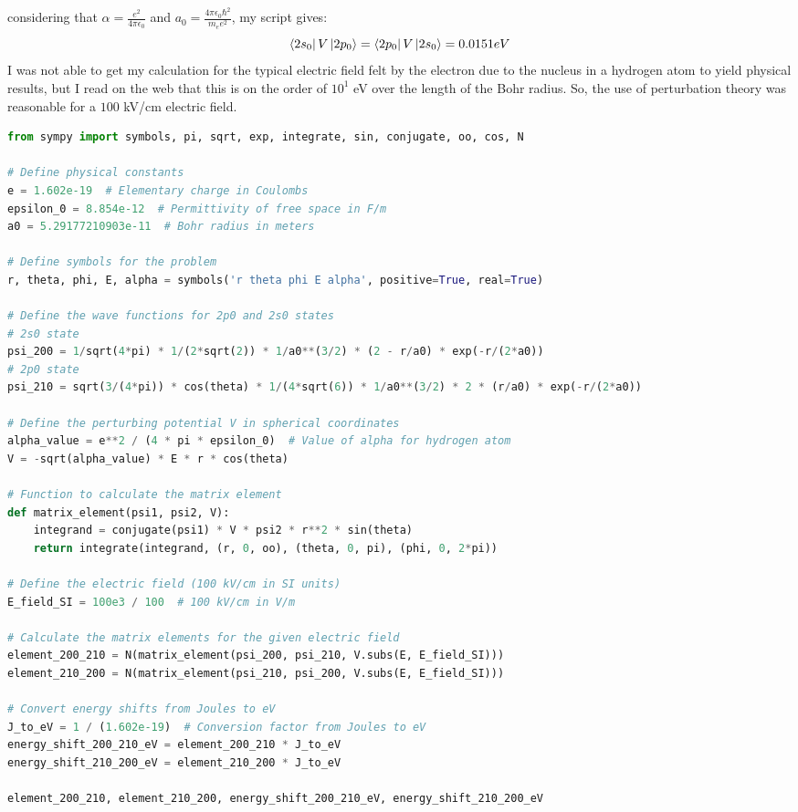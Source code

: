 \documentclass[12pt]{article}
\begin{document}
\subsubsection{}
considering that $\alpha = \frac{e^2}{4\pi\epsilon_0}$ and $a_0 = \frac{4\pi\epsilon_0\hbar^2}{m_e e^2}$, my script gives:
\begin{equation}
  \bra{2s_{0}}V\ket{2p_{0}} = \bra{2p_{0}}V\ket{2s_{0}} = 0.0151 eV
\end{equation}
I was not able to get my calculation for the typical electric field felt by the electron due to the nucleus in a hydrogen atom to yield physical results, but I read on the web that this is on the order of $10^1$ eV over the length of the Bohr radius. So, the use of perturbation theory was reasonable for a $100$ kV/cm electric field.
\begin{lstlisting}[language=Python]
from sympy import symbols, pi, sqrt, exp, integrate, sin, conjugate, oo, cos, N

# Define physical constants
e = 1.602e-19  # Elementary charge in Coulombs
epsilon_0 = 8.854e-12  # Permittivity of free space in F/m
a0 = 5.29177210903e-11  # Bohr radius in meters

# Define symbols for the problem
r, theta, phi, E, alpha = symbols('r theta phi E alpha', positive=True, real=True)

# Define the wave functions for 2p0 and 2s0 states
# 2s0 state
psi_200 = 1/sqrt(4*pi) * 1/(2*sqrt(2)) * 1/a0**(3/2) * (2 - r/a0) * exp(-r/(2*a0))
# 2p0 state
psi_210 = sqrt(3/(4*pi)) * cos(theta) * 1/(4*sqrt(6)) * 1/a0**(3/2) * 2 * (r/a0) * exp(-r/(2*a0))

# Define the perturbing potential V in spherical coordinates
alpha_value = e**2 / (4 * pi * epsilon_0)  # Value of alpha for hydrogen atom
V = -sqrt(alpha_value) * E * r * cos(theta)

# Function to calculate the matrix element
def matrix_element(psi1, psi2, V):
    integrand = conjugate(psi1) * V * psi2 * r**2 * sin(theta)
    return integrate(integrand, (r, 0, oo), (theta, 0, pi), (phi, 0, 2*pi))

# Define the electric field (100 kV/cm in SI units)
E_field_SI = 100e3 / 100  # 100 kV/cm in V/m

# Calculate the matrix elements for the given electric field
element_200_210 = N(matrix_element(psi_200, psi_210, V.subs(E, E_field_SI)))
element_210_200 = N(matrix_element(psi_210, psi_200, V.subs(E, E_field_SI)))

# Convert energy shifts from Joules to eV
J_to_eV = 1 / (1.602e-19)  # Conversion factor from Joules to eV
energy_shift_200_210_eV = element_200_210 * J_to_eV
energy_shift_210_200_eV = element_210_200 * J_to_eV

element_200_210, element_210_200, energy_shift_200_210_eV, energy_shift_210_200_eV


\end{lstlisting}
\end{document}
